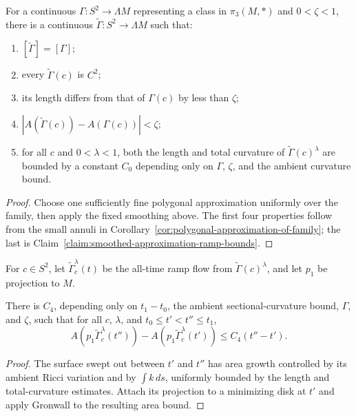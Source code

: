 \begin{lemma}
\label{lem:good-approximation-family}
\label{goodapprox}
For a continuous $\Gamma\colon S^2\to\Lambda M$ representing a class in
$\pi_3(M,*)$ and $0<\zeta<1$, there is a continuous
$\widetilde\Gamma\colon S^2\to\Lambda M$ such that:
\begin{enumerate}
\item $[\widetilde\Gamma]=[\Gamma]$;
\item every $\widetilde\Gamma(c)$ is $C^2$;
\item its length differs from that of $\Gamma(c)$ by less than $\zeta$;
\item $|A(\widetilde\Gamma(c))-A(\Gamma(c))|<\zeta$;
\item for all $c$ and $0<\lambda<1$, both the length and total curvature of
$\widetilde\Gamma(c)^\lambda$ are bounded by a constant $C_0$ depending only
on $\Gamma$, $\zeta$, and the ambient curvature bound.
\end{enumerate}
\end{lemma}
\begin{proof}
\sketch Choose one sufficiently fine polygonal approximation uniformly over the
family, then apply the fixed smoothing above. The first four properties follow
from the small annuli in
Corollary~\ref{cor:polygonal-approximation-of-family}; the last is
Claim~\ref{claim:smoothed-approximation-ramp-bounds}.
\end{proof}

For $c\in S^2$, let $\widetilde\Gamma_c^\lambda(t)$ be the all-time ramp flow
from $\widetilde\Gamma(c)^\lambda$, and let $p_1$ be projection to $M$.

\begin{claim}
\label{claim:area-forward-difference-linear-bound}
\label{areachange}
There is $C_4$, depending only on $t_1-t_0$, the ambient sectional-curvature
bound, $\Gamma$, and $\zeta$, such that for all $c$, $\lambda$, and
$t_0\le t'<t''\le t_1$,
\[
A(p_1\widetilde\Gamma_c^\lambda(t''))
-A(p_1\widetilde\Gamma_c^\lambda(t'))\le C_4(t''-t').
\]
\end{claim}
\begin{proof}
\sketch The surface swept out between $t'$ and $t''$ has area growth controlled by its
ambient Ricci variation and by $\int k\,ds$, uniformly bounded by the length
and total-curvature estimates. Attach its projection to a minimizing disk at
$t'$ and apply Gronwall to the resulting area bound.
\end{proof}

